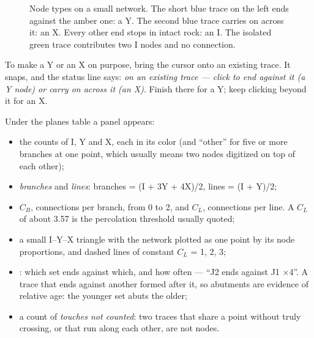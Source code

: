 \begin{figure}[htbp]\centering
{}
\caption{Node types on a small network. The short blue trace on the left ends against the amber one: a Y. The second blue trace carries on across it: an X. Every other end stops in intact rock: an I. The isolated green trace contributes two I nodes and no connection.}\label{fig:structure-nodes}
\end{figure}

To make a Y or an X on purpose, bring the cursor onto an existing trace. It snaps, and the status line says: \emph{on an existing trace — click to end against it (a Y node) or carry on across it (an X)}. Finish there for a Y; keep clicking beyond it for an X.

Under the planes table a  panel appears:

\begin{itemize}
\item the counts of I, Y and X, each in its color (and “other” for five or more branches at one point, which usually means two nodes digitized on top of each other);
\item \emph{branches} and \emph{lines}: branches = (I + 3Y + 4X)/2, lines = (I + Y)/2;
\item $C_B$, connections per branch, from 0 to 2, and $C_L$, connections per line. A $C_L$ of about 3.57 is the percolation threshold usually quoted;
\item a small I–Y–X triangle with the network plotted as one point by its node proportions, and dashed lines of constant $C_L$ = 1, 2, 3;
\item {}: which set ends against which, and how often — “J2 ends against J1 ×4”. A trace that ends against another formed after it, so abutments are evidence of relative age: the younger set abuts the older;
\item a count of \emph{touches not counted}: two traces that share a point without truly crossing, or that run along each other, are not nodes.
\end{itemize}

